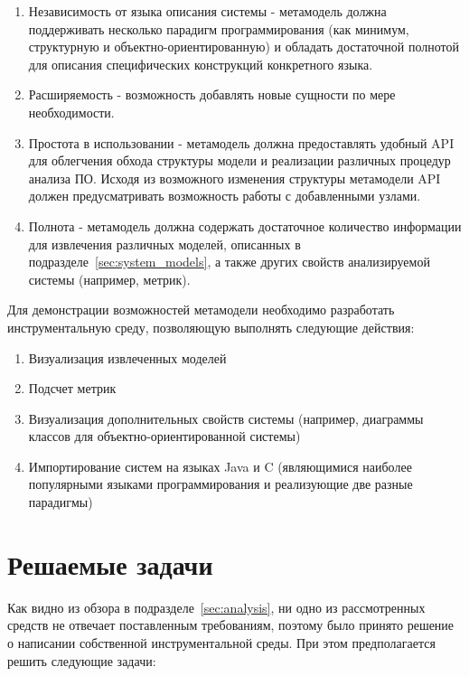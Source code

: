 \begin{enumerate}
    \item Независимость от языка описания системы - метамодель должна
    поддерживать несколько парадигм программирования (как минимум, структурную и
    объектно-ориентированную) и обладать достаточной полнотой для
    описания специфических конструкций конкретного языка.
    \item Расширяемость - возможность добавлять новые сущности по мере
    необходимости.
    \item Простота в использовании - метамодель должна предоставлять удобный API
    для облегчения обхода структуры модели и реализации различных процедур
    анализа ПО. Исходя из возможного изменения структуры метамодели API должен
    предусматривать возможность работы с добавленными узлами.
    \item Полнота - метамодель должна содержать достаточное количество
    информации для извлечения различных моделей, описанных в
    подразделе~\ref{sec:system_models}, а также других свойств анализируемой
    системы (например, метрик).
\end{enumerate}

Для демонстрации возможностей метамодели необходимо разработать инструментальную
среду, позволяющую выполнять следующие действия:

\begin{enumerate}
    \item Визуализация извлеченных моделей
    \item Подсчет метрик
    \item Визуализация дополнительных свойств системы (например, диаграммы
    классов для объектно-ориентированной системы)
    \item Импортирование систем на языках Java и C (являющимися наиболее
    популярными языками программирования и реализующие две разные парадигмы)
\end{enumerate}

\section{Решаемые задачи}
\label{sec:tasks}

Как видно из обзора в подразделе~\ref{sec:analysis}, ни одно из рассмотренных
средств не отвечает поставленным требованиям, поэтому было принято решение о
написании собственной инструментальной среды. При этом предполагается решить
следующие задачи:

